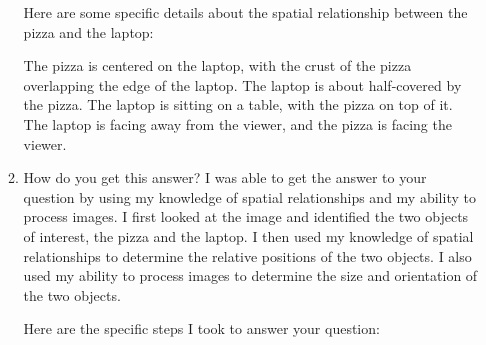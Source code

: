 \begin{enumerate}
\begin{enumerate}
        Here are some specific details about the spatial relationship between the pizza and the laptop:
        
        The pizza is centered on the laptop, with the crust of the pizza overlapping the edge of the laptop.
        The laptop is about half-covered by the pizza.
        The laptop is sitting on a table, with the pizza on top of it.
        The laptop is facing away from the viewer, and the pizza is facing the viewer.
        
        \item How do you get this answer?
        \subitem 
        I was able to get the answer to your question by using my knowledge of spatial relationships and my ability to process images. I first looked at the image and identified the two objects of interest, the pizza and the laptop. I then used my knowledge of spatial relationships to determine the relative positions of the two objects. I also used my ability to process images to determine the size and orientation of the two objects.
        
        Here are the specific steps I took to answer your question:
        

\end{enumerate}
\end{enumerate}
